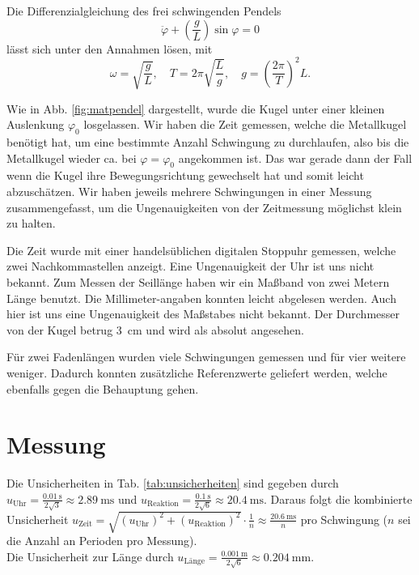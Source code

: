 \documentclass[11pt,a4paper,titlepage, ngerman]{article}
\begin{document}
		Die Differenzialgleichung des frei schwingenden Pendels
		\begin{equation*}
		\ddot{\varphi}+\left( \frac{g}{L}\right)  \sin \varphi = 0
		\end{equation*}
		lässt sich unter den Annahmen lösen, mit 
		\begin{equation}
		\label{eq:g}
		\omega =  \sqrt{\frac{g}{L}}, \quad 
		T =  2\pi \sqrt{\frac{L}{g}}, \quad
		g = \left(\frac{2 \pi}{T}\right)^2 L.
		\end{equation}
		
		
		Wie in Abb. \ref{fig:matpendel} dargestellt, wurde die Kugel unter einer kleinen Auslenkung $\varphi_0$ losgelassen.
		Wir haben die Zeit gemessen, welche die Metallkugel benötigt hat, um eine bestimmte Anzahl Schwingung zu durchlaufen, also bis die Metallkugel wieder ca. bei $\varphi = \varphi_0$ angekommen ist.
		Das war gerade dann der Fall wenn die Kugel ihre Bewegungsrichtung gewechselt hat und somit leicht abzuschätzen.
		Wir haben jeweils mehrere Schwingungen in einer Messung zusammengefasst, um die Ungenauigkeiten von der Zeitmessung möglichst klein zu halten. 
		
		Die Zeit wurde mit einer handelsüblichen digitalen Stoppuhr gemessen, welche zwei Nachkommastellen anzeigt.
		Eine Ungenauigkeit der Uhr ist uns nicht bekannt.
		Zum Messen der Seillänge haben wir ein Maßband von zwei Metern Länge benutzt. Die Millimeter-angaben konnten leicht abgelesen werden.
		Auch hier ist uns eine Ungenauigkeit des Maßstabes nicht bekannt.
		Der Durchmesser von der Kugel betrug \SI{3}{\centi\meter} und wird als absolut angesehen.
		
		Für zwei Fadenlängen wurden viele Schwingungen gemessen und für vier weitere weniger.
		Dadurch konnten zusätzliche Referenzwerte geliefert werden, welche ebenfalls gegen die Behauptung gehen.
		
	\section{Messung}
	\label{Messung}
		Die Unsicherheiten in Tab. \ref{tab:unsicherheiten} sind gegeben durch
		$u_\text{Uhr} = \frac{\SI{0,01}{\second}}{2\sqrt{3}}\approx \SI{2,89}{\milli\second}$ und $u_\text{Reaktion} = \frac{\SI{0,1}{\second}}{2\sqrt{6}} \approx \SI{20,4}{\milli\second}$.
		Daraus folgt die kombinierte Unsicherheit $u_\text{Zeit} = \sqrt{\left( u_\text{Uhr}\right) ^2+\left( u_\text{Reaktion}\right) ^2}\cdot\frac{1}{n} \approx \frac{\SI{20,6}{\milli\second}}{n}$ pro Schwingung ($n$ sei die Anzahl an Perioden pro Messung).\\
		Die Unsicherheit zur Länge durch $u_\text{Länge} = \frac{\SI{0,001}{\meter}}{2\sqrt{6}} \approx \SI{0,204}{\milli\meter}$.
			
\end{document}
